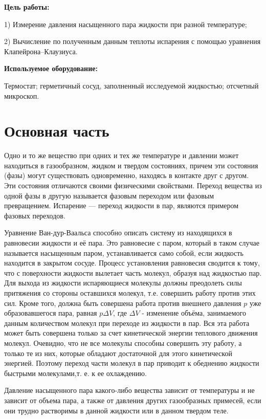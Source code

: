 \documentclass[a4paper,10pt]{article} %
\begin{document}
\textbf{Цель работы:}

1) Измерение давления насыщенного пара жидкости при разной температуре; 

2) Вычисление по полученным данным
теплоты испарения с помощью уравнения Клапейрона–Клаузиуса.

\textbf{Используемое оборудование:}

Термостат; герметичный сосуд, заполненный исследуемой жидкостью; отсчетный микроскоп.

\section{Основная часть}

Одно и то же вещество при одних и тех же температуре и давлении может находиться в газообразном, жидком и 
твердом состояниях, причем эти состояния (фазы) могут существовать одновременно, находясь в контакте друг с другом.
 Эти состояния отличаются своими физическими свойствами. Переход вещества из одной фазы в другую называется 
 фазовым переходом или фазовым превращением. Испарение — переход жидкости в пар, являются примером фазовых переходов. 

Уравнение Ван-дур-Ваальса способно описать систему из находящихся в равновесии жидкости и её пара. Это равновесие с паром, 
который в таком случае называется насыщенным паром, устанавливается само собой, если жидкость находится в 
закрытом сосуде. Процесс установления равновесия сводится к тому, что с поверхности жидкости вылетает часть 
молекул, образуя над жидкостью пар. Для выхода из жидкости испаряющиеся молекулы должны преодолеть силы притяжения 
со стороны оставшихся молекул, т.е. совершить работу против этих сил. Кроме того, должна быть совершена работа 
против внешнего давления $p$ уже образовавшегося пара, равная $p \Delta V$, где $\Delta V$ - изменение объёма,
занимаемого данным количеством молекул при переходе из жидкости в пар. Вся эта работа может быть совершена 
только за счет кинетической энергии теплового движения молекул. Очевидно, что не все молекулы способны совершить 
эту работу, а только те из них, которые обладают достаточной для этого кинетической энергией. Поэтому переход 
части молекул в пар приводит к обеднению жидкости быстрыми молекулами,т. е. к ее охлаждению.

Давление насыщенного пара какого-либо вещества зависит от температуры и не зависит от объема пара, а также 
от давления других газообразных примесей, если они трудно растворимы в данной жидкости или в данном твердом теле.
\end{document}
